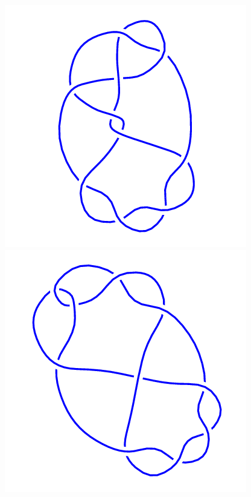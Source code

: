 \begin{figure}[H]
\begin{minipage}[b]{.18\linewidth}
	\end{minipage}
	\begin{minipage}[b]{.18\linewidth}
		\centering
		\includegraphics[width=\linewidth]{../data/10_14.png}
	\end{minipage}
	\begin{minipage}[b]{.18\linewidth}
		\centering
		\includegraphics[width=\linewidth]{../data/10_15.png}

\end{minipage}
\end{figure}
